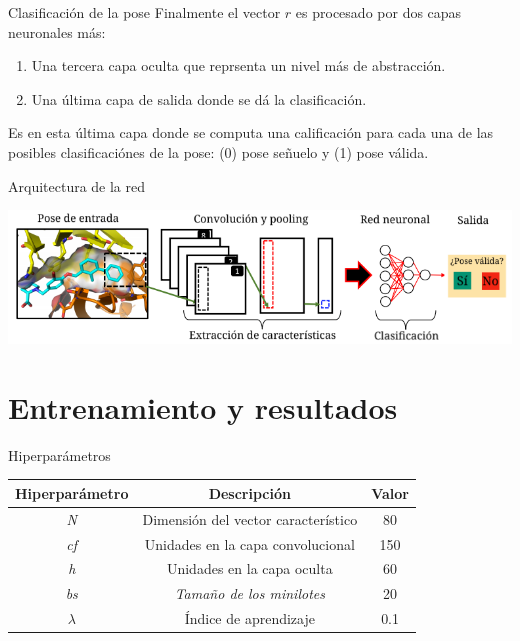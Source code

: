 \documentclass[presentation]{beamer}
\begin{document}
\begin{frame}[label={sec:org09a8f24}]{Clasificación de la pose}
Finalmente el vector \(r\) es procesado por dos capas neuronales más:
\begin{enumerate}
\item Una tercera capa oculta que reprsenta un nivel más de abstracción.
\item Una última capa de salida donde se dá la clasificación.
\end{enumerate}

Es en esta última capa donde se computa una calificación para cada
una de las posibles clasificaciónes de la pose: (0) pose \alert{señuelo} y
(1) pose \alert{válida}.
\end{frame}
\begin{frame}[label={sec:org53ad36c}]{Arquitectura de la red}
\begin{center}
\includegraphics[width=.9\linewidth]{images/architecture.png}
\end{center}
\end{frame}
\section{Entrenamiento y resultados}
\label{sec:orgebe02e0}
\begin{frame}[label={sec:orgc40c9e5}]{Hiperparámetros}
\begin{table}[H]
\begin{center}
\begin{tabular}{|c|c|c|}
\hline
Hiperparámetro & Descripción                         & Valor \\ \hline
\textit{N}     & Dimensión del vector característico & 80    \\
\textit{cf}    & Unidades en la capa convolucional   & 150   \\
\textit{h}     & Unidades en la capa oculta          & 60    \\
\textit{bs}    & \textit{Tamaño de los minilotes}    & 20    \\
$\lambda$         & Índice de aprendizaje               & 0.1   \\ \hline
\end{tabular}
\end{center}
\end{table}
\end{frame}
\end{document}

